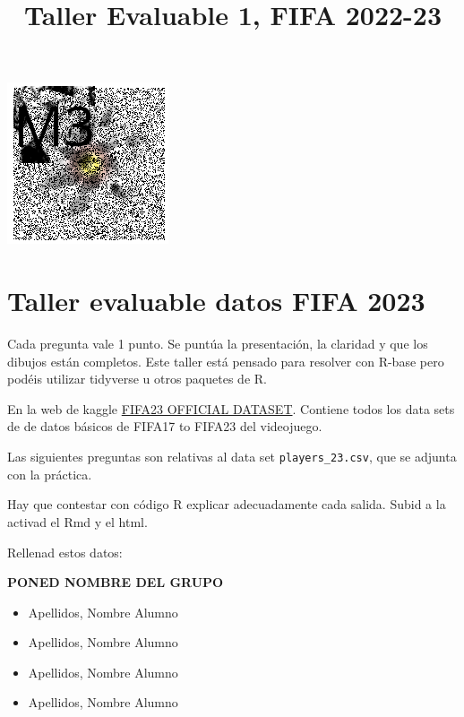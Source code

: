 \documentclass[
]{article}
\title{Taller Evaluable 1, FIFA 2022-23}
\author{}
\date{\vspace{-2.5em}}
\providecommand{\tightlist}{%
  \setlength{\itemsep}{0pt}\setlength{\parskip}{0pt}}
\begin{document}
\maketitle

\begin{flushright}\includegraphics[width=0.7\linewidth]{logoM3} \end{flushright}

\hypertarget{taller-evaluable-datos-fifa-2023}{%
\section{Taller evaluable datos FIFA
2023}\label{taller-evaluable-datos-fifa-2023}}

Cada pregunta vale 1 punto. Se puntúa la presentación, la claridad y que
los dibujos están completos. Este taller está pensado para resolver con
R-base pero podéis utilizar tidyverse u otros paquetes de R.

En la web de kaggle
\href{https://www.kaggle.com/datasets/bryanb/fifa-player-stats-database}{FIFA23
OFFICIAL DATASET}. Contiene todos los data sets de de datos básicos de
FIFA17 to FIFA23 del videojuego.

Las siguientes preguntas son relativas al data set
\texttt{players\_23.csv}, que se adjunta con la práctica.

Hay que contestar con código R explicar adecuadamente cada salida. Subid
a la activad el Rmd y el html.

Rellenad estos datos:

\textbf{PONED NOMBRE DEL GRUPO}

\begin{itemize}
\tightlist
\item
  Apellidos, Nombre Alumno
\item
  Apellidos, Nombre Alumno
\item
  Apellidos, Nombre Alumno
\item
  Apellidos, Nombre Alumno
\end{itemize}
\end{document}
